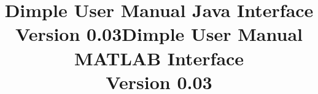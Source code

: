 \documentclass[11pt, oneside]{article}   	%
\title{\huge \bfseries Dimple User Manual \linebreak Java Interface \\ \normalfont \large Version 0.03}
\title{\huge \bfseries Dimple User Manual \linebreak MATLAB Interface \\ \normalfont \large Version 0.03}
\newif\ifmatlab
\begin{document}
\maketitle


\clearpage
\setcounter{tocdepth}{5}				%
\tableofcontents

\clearpage







\begin{appendices}

\ifmatlab

\fi
\end{appendices}
\end{document}
